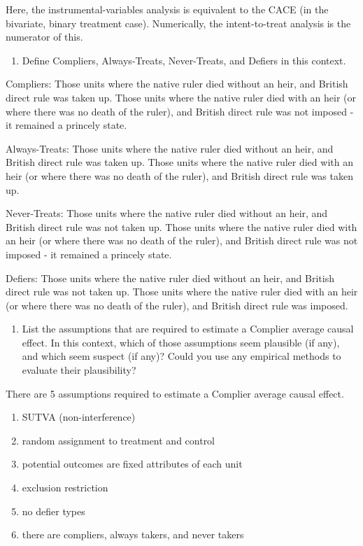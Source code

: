 \documentclass[
]{article}
\providecommand{\tightlist}{%
  \setlength{\itemsep}{0pt}\setlength{\parskip}{0pt}}
\begin{document}
Here, the instrumental-variables analysis is equivalent to the CACE (in
the bivariate, binary treatment case). Numerically, the intent-to-treat
analysis is the numerator of this.

\begin{enumerate}
\def\labelenumi{(\alph{enumi})}
\setcounter{enumi}{1}
\tightlist
\item
  Define Compliers, Always-Treats, Never-Treats, and Defiers in this
  context.
\end{enumerate}

Compliers: Those units where the native ruler died without an heir, and
British direct rule was taken up. Those units where the native ruler
died with an heir (or where there was no death of the ruler), and
British direct rule was not imposed - it remained a princely state.

Always-Treats: Those units where the native ruler died without an heir,
and British direct rule was taken up. Those units where the native ruler
died with an heir (or where there was no death of the ruler), and
British direct rule was taken up.

Never-Treats: Those units where the native ruler died without an heir,
and British direct rule was not taken up. Those units where the native
ruler died with an heir (or where there was no death of the ruler), and
British direct rule was not imposed - it remained a princely state.

Defiers: Those units where the native ruler died without an heir, and
British direct rule was not taken up. Those units where the native ruler
died with an heir (or where there was no death of the ruler), and
British direct rule was imposed.

\begin{enumerate}
\def\labelenumi{(\alph{enumi})}
\setcounter{enumi}{2}
\tightlist
\item
  List the assumptions that are required to estimate a Complier average
  causal effect. In this context, which of those assumptions seem
  plausible (if any), and which seem suspect (if any)? Could you use any
  empirical methods to evaluate their plausibility?
\end{enumerate}

There are 5 assumptions required to estimate a Complier average causal
effect.

\begin{enumerate}
\def\labelenumi{\arabic{enumi}.}
\tightlist
\item
  SUTVA (non-interference)
\item
  random assignment to treatment and control
\item
  potential outcomes are fixed attributes of each unit
\item
  exclusion restriction
\item
  no defier types
\item
  there are compliers, always takers, and never takers
\end{enumerate}
\end{document}
